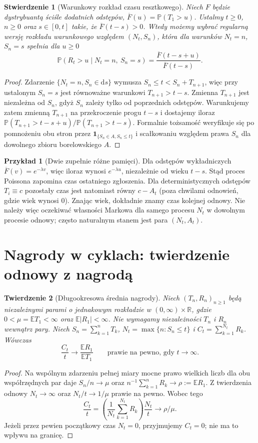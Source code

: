 \documentclass[11pt,a4paper,oneside]{report}
\numberwithin{equation}{chapter}
\theoremstyle{plain}
\newtheorem{twierdzenie}{Twierdzenie}[chapter]
\newtheorem{stwierdzenie}[twierdzenie]{Stwierdzenie}
\theoremstyle{definition}
\newtheorem{przyklad}{Przykład}[chapter]
\theoremstyle{remark}
\newcommand{\R}{\mathbb{R}}
\newcommand{\Prob}{\mathbb{P}}
\newcommand{\E}{\mathbb{E}}
\newcommand{\ind}[1]{\mathbf{1}_{#1}}
\newcommand{\dd}{\mathrm{d}}
\begin{document}
\begin{stwierdzenie}[Warunkowy rozkład czasu resztkowego]
Niech $F$ będzie dystrybuantą ściśle dodatnich odstępów,
$\overline F(u)=\Prob(T_1>u)$.
Ustalmy $t\ge0$, $n\ge0$ oraz $s\in[0,t]$ takie, że
$\overline F(t-s)>0$. Wtedy możemy wybrać regularną wersję rozkładu
warunkowego względem $(N_t,S_n)$, która dla
warunków $N_t=n$, $S_n=s$ spełnia dla $u\ge0$
\[
\Prob(R_t>u\mid N_t=n,\ S_n=s)
=\frac{\overline F(t-s+u)}{\overline F(t-s)}.
\]
\end{stwierdzenie}
\begin{proof}
Zdarzenie $\{N_t=n,S_n\in\dd s\}$ wymusza
$S_n\le t<S_n+T_{n+1}$, więc przy ustalonym
$S_n=s$ jest równoważne warunkowi $T_{n+1}>t-s$.
Zmienna $T_{n+1}$ jest niezależna od $S_n$, gdyż
$S_n$ zależy tylko od poprzednich odstępów.
Warunkujemy zatem zmienną $T_{n+1}$ na przekroczenie
progu $t-s$ i dostajemy iloraz
$\Prob(T_{n+1}>t-s+u)/\Prob(T_{n+1}>t-s)$.
Formalnie tożsamość weryfikuje się po pomnożeniu obu stron
przez $\ind{\{S_n\in A,S_n\le t\}}$ i scałkowaniu względem
prawa $S_n$ dla dowolnego zbioru borelowskiego $A$.
\end{proof}

\begin{przyklad}[Dwie zupełnie różne pamięci]
Dla odstępów wykładniczych $\overline F(v)=e^{-\lambda v}$,
więc iloraz wynosi $e^{-\lambda u}$, niezależnie od wieku
$t-s$. Stąd proces Poissona zapomina czas ostatniego zgłoszenia.
Dla deterministycznych odstępów $T_i\equiv c$ pozostały czas
jest natomiast równy $c-A_t$ (poza chwilami odnowień, gdzie
wiek wynosi $0$). Znając wiek, dokładnie znamy czas kolejnej
odnowy. Nie należy więc oczekiwać własności Markowa dla
samego procesu $N_t$ w dowolnym procesie odnowy; często
naturalnym stanem jest para $(N_t,A_t)$.
\end{przyklad}

\section{Nagrody w cyklach: twierdzenie odnowy z nagrodą}
\begin{twierdzenie}[Długookresowa średnia nagrody]
Niech $(T_n,R_n)_{n\ge1}$ będą niezależnymi parami o jednakowym
rozkładzie w $(0,\infty)\times\R$, gdzie
$0<\mu=\E T_1<\infty$ oraz $\E|R_1|<\infty$.
Nie wymagamy niezależności $T_n$ i $R_n$ wewnątrz pary.
Niech $S_n=\sum_{k=1}^nT_k$, $N_t=\max\{n:S_n\le t\}$ i
$C_t=\sum_{k=1}^{N_t}R_k$. Wówczas
\[
\frac{C_t}{t}\longrightarrow\frac{\E R_1}{\E T_1}
\qquad\text{prawie na pewno, gdy }t\to\infty.
\]
\end{twierdzenie}
\begin{proof}
Na wspólnym zdarzeniu pełnej miary mocne prawo wielkich liczb
dla obu współrzędnych par daje
$S_n/n\to\mu$ oraz $n^{-1}\sum_{k=1}^nR_k\to\rho:=\E R_1$.
Z twierdzenia odnowy $N_t\to\infty$ oraz
$N_t/t\to1/\mu$ prawie na pewno. Wobec tego
\[
\frac{C_t}{t}=
\left(\frac{1}{N_t}\sum_{k=1}^{N_t}R_k\right)
\frac{N_t}{t}\longrightarrow\rho/\mu.
\]
Jeżeli przez pewien początkowy czas $N_t=0$, przyjmujemy
$C_t=0$; nie ma to wpływu na granicę.
\end{proof}
\end{document}
